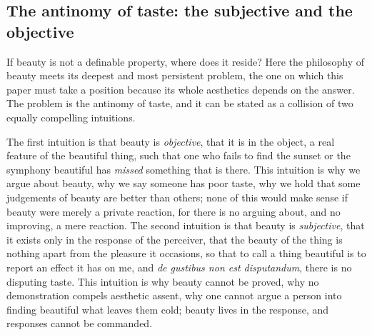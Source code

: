 \subsection{The antinomy of taste: the subjective and the objective}
\label{p21:sub:ap-antinomy}

If beauty is not a definable property, where does it reside? Here the philosophy of beauty meets its deepest and most persistent problem, the one on which this paper must take a position because its whole aesthetics depends on the answer. The problem is the antinomy of taste, and it can be stated as a collision of two equally compelling intuitions.

The first intuition is that beauty is \emph{objective}, that it is in the object, a real feature of the beautiful thing, such that one who fails to find the sunset or the symphony beautiful has \emph{missed} something that is there. This intuition is why we argue about beauty, why we say someone has poor taste, why we hold that some judgements of beauty are better than others; none of this would make sense if beauty were merely a private reaction, for there is no arguing about, and no improving, a mere reaction. The second intuition is that beauty is \emph{subjective}, that it exists only in the response of the perceiver, that the beauty of the thing is nothing apart from the pleasure it occasions, so that to call a thing beautiful is to report an effect it has on me, and \emph{de gustibus non est disputandum}, there is no disputing taste. This intuition is why beauty cannot be proved, why no demonstration compels aesthetic assent, why one cannot argue a person into finding beautiful what leaves them cold; beauty lives in the response, and responses cannot be commanded.

